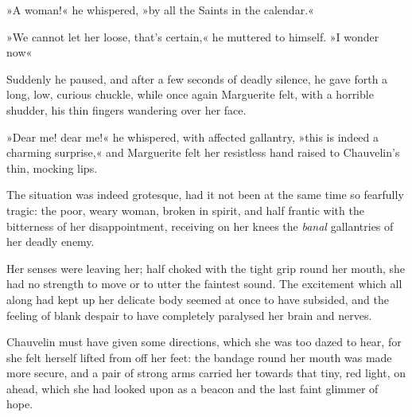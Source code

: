 »A woman!« he whispered, »by all the Saints in the calendar.«

»We cannot let her loose, that's certain,« he muttered to himself. »I wonder now\textellipsis«

Suddenly he paused, and after a few seconds of deadly silence, he gave forth a long, low, curious chuckle, while once again Marguerite felt, with a horrible shudder, his thin fingers wandering over her face.

»Dear me! dear me!« he whispered, with affected gallantry, »this is indeed a charming surprise,« and Marguerite felt her resistless hand raised to Chauvelin's thin, mocking lips.

The situation was indeed grotesque, had it not been at the same time so fearfully tragic: the poor, weary woman, broken in spirit, and half frantic with the bitterness of her disappointment, receiving on her knees the \textit{banal} gallantries of her deadly enemy.

Her senses were leaving her; half choked with the tight grip round her mouth, she had no strength to move or to utter the faintest sound. The excitement which all along had kept up her delicate body seemed at once to have subsided, and the feeling of blank despair to have completely paralysed her brain and nerves.

Chauvelin must have given some directions, which she was too dazed to hear, for she felt herself lifted from off her feet: the bandage round her mouth was made more secure, and a pair of strong arms carried her towards that tiny, red light, on ahead, which she had looked upon as a beacon and the last faint glimmer of hope.

